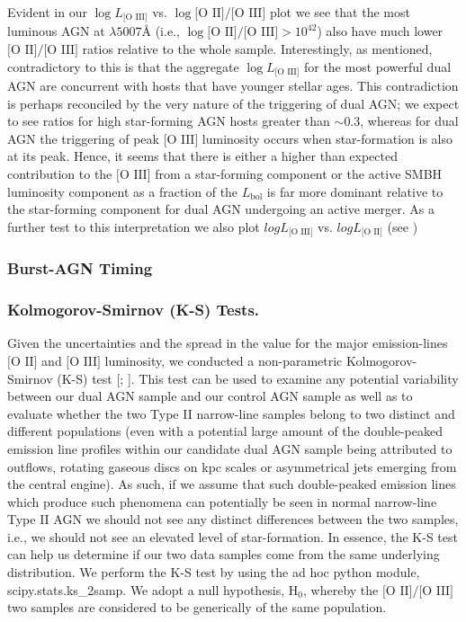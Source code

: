 Evident in our $\log{L_{\text{[O III]}}}$ vs. $\log{\text{[O II]}/\text{[O III]}}$ plot we see that the most luminous AGN at $\lambda5007Å$ (i.e., $\log{\text{[O II]}/\text{[O III]}}>{10^{42}}$) also have much lower $\text{[O II]}/\text{[O III]}$ ratios relative to the whole sample. Interestingly, as mentioned, contradictory to this is that the aggregate $\log{L_{\text{[O III]}}}$ for the most powerful dual AGN are concurrent with hosts that have younger stellar ages. This contradiction is perhaps reconciled by the very nature of the triggering of dual AGN; we expect to see ratios for high star-forming AGN hosts greater than $\sim{0.3}$, whereas for dual AGN the triggering of peak $\text{[O III]}$ luminosity occurs when star-formation is also at its peak. Hence, it seems that there is either a higher than expected contribution to the $\text{[O III]}$ from a star-forming component or the active SMBH luminosity component as a fraction of the $L_{\text{bol}}$ is far more dominant relative to the star-forming component for dual AGN undergoing an active merger. As a further test to this interpretation we also plot $log{L_{\text{[O III]}}}$ vs. $log{L_{\text{[O II]}}}$ (see )

\subsubsection{Burst-AGN Timing}


 
\subsubsection{Kolmogorov-Smirnov (K-S) Tests.}

Given the uncertainties and the spread in the value for the major emission-lines $\text{[O II]}$ and $\text{[O III]}$ luminosity, we conducted a non-parametric Kolmogorov-Smirnov (K-S) test [\cite{Peacock_1983}; \cite{Justel_1997}]. This test can be used to examine any potential variability between our dual AGN sample and our control AGN sample as well as to evaluate whether the two Type II narrow-line samples belong to two distinct and different populations (even with a potential large amount of the double-peaked emission line profiles within our candidate dual AGN sample being attributed to outflows, rotating gaseous discs on kpc scales or asymmetrical jets emerging from the central engine). As such, if we assume that such double-peaked emission lines which produce such phenomena can potentially be seen in normal narrow-line Type II AGN we should not see any distinct differences between the two samples, i.e., we should not see an elevated level of star-formation. In essence, the K-S test can help us determine if our two data samples come from the same underlying distribution. We perform the K-S test by using the ad hoc python module, scipy.stats.ks_2samp. We adopt a null hypothesis, $\text{H}_{0}$, whereby the $\text{[O II]}/\text{[O III]}$ two samples are considered to be generically of the same population.  

